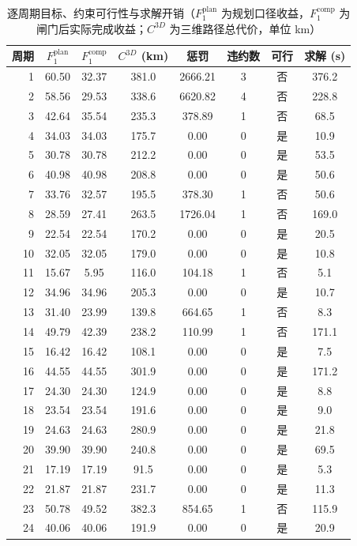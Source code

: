 \documentclass[a4paper,11pt]{article}
\begin{document}
\begin{table}[htbp]\centering
\caption{逐周期目标、约束可行性与求解开销（$F_1^{\mathrm{plan}}$ 为规划口径收益，$F_1^{\mathrm{comp}}$ 为闸门后实际完成收益；$C^{3D}$ 为三维路径总代价，单位 km）}
\label{tab:exp01-objective}
\begin{tabular}{rccccccc}
\toprule
周期 & $F_1^{\mathrm{plan}}$ & $F_1^{\mathrm{comp}}$ & $C^{3D}$ (km) & 惩罚 & 违约数 & 可行 & 求解 (s) \\
\midrule
1 & 60.50 & 32.37 & 381.0 & 2666.21 & 3 & 否 & 376.2 \\
2 & 58.56 & 29.53 & 338.6 & 6620.82 & 4 & 否 & 228.8 \\
3 & 42.64 & 35.54 & 235.3 & 378.89 & 1 & 否 & 68.5 \\
4 & 34.03 & 34.03 & 175.7 & 0.00 & 0 & 是 & 10.9 \\
5 & 30.78 & 30.78 & 212.2 & 0.00 & 0 & 是 & 53.5 \\
6 & 40.98 & 40.98 & 208.8 & 0.00 & 0 & 是 & 50.6 \\
7 & 33.76 & 32.57 & 195.5 & 378.30 & 1 & 否 & 50.6 \\
8 & 28.59 & 27.41 & 263.5 & 1726.04 & 1 & 否 & 169.0 \\
9 & 22.54 & 22.54 & 170.2 & 0.00 & 0 & 是 & 20.5 \\
10 & 32.05 & 32.05 & 179.0 & 0.00 & 0 & 是 & 10.8 \\
11 & 15.67 & 5.95 & 116.0 & 104.18 & 1 & 否 & 5.1 \\
12 & 34.96 & 34.96 & 205.3 & 0.00 & 0 & 是 & 10.7 \\
13 & 31.40 & 23.99 & 139.8 & 664.65 & 1 & 否 & 8.3 \\
14 & 49.79 & 42.39 & 238.2 & 110.99 & 1 & 否 & 171.1 \\
15 & 16.42 & 16.42 & 108.1 & 0.00 & 0 & 是 & 7.5 \\
16 & 44.55 & 44.55 & 301.9 & 0.00 & 0 & 是 & 171.2 \\
17 & 24.30 & 24.30 & 124.9 & 0.00 & 0 & 是 & 8.8 \\
18 & 23.54 & 23.54 & 191.6 & 0.00 & 0 & 是 & 9.0 \\
19 & 24.63 & 24.63 & 280.9 & 0.00 & 0 & 是 & 21.8 \\
20 & 39.90 & 39.90 & 240.8 & 0.00 & 0 & 是 & 69.5 \\
21 & 17.19 & 17.19 & 91.5 & 0.00 & 0 & 是 & 5.3 \\
22 & 21.87 & 21.87 & 231.7 & 0.00 & 0 & 是 & 11.3 \\
23 & 50.78 & 49.52 & 382.3 & 854.65 & 1 & 否 & 115.9 \\
24 & 40.06 & 40.06 & 191.9 & 0.00 & 0 & 是 & 20.9 \\
\bottomrule
\end{tabular}
\end{table}
\end{document}
